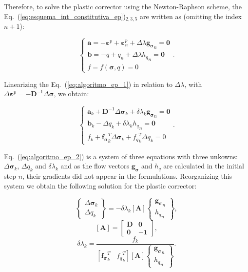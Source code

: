 \documentclass[Journal,letterpaper]{ascelike-new}
\newcommand{\All}{\boldsymbol A}
\newcommand{\al}{\boldsymbol a}
\newcommand{\bl}{\boldsymbol b}
\newcommand{\dfds}{\boldsymbol{f_\sigma}}
\newcommand{\dfdq}{{f_q}}
\newcommand{\dgds}{\boldsymbol{g_\sigma}}
\newcommand{\Dsdee}{\boldsymbol{D}}
\newcommand{\hl}{{h_q}}
\newcommand{\onell}{\boldsymbol{1}}
\newcommand{\strainp}{\boldsymbol{\varepsilon}^{p}}
\newcommand{\stress}{\boldsymbol{\sigma}}
\newcommand{\zerol}{\boldsymbol 0}
\begin{document}
Therefore, to solve the plastic corrector using the Newton-Raphson scheme, the Eq.~(\ref{eq:esquema_int_constitutiva_ep})$_{2,3,5}$ are written as (omitting the index $n+1$):

\begin{equation}
	\label{eq:algoritmo_ep_1}
	\left\{
	\begin{array}{lcl}
		\al = -\strainp + \strainp_n + \Delta \lambda \dgds_n = \zerol	\\
		\bl = -q + q_n + \Delta\lambda\hl_n = \zerol \\
		f = f(\stress,q) = 0
	\end{array}
	\right..
\end{equation}

Linearizing the Eq.~(\ref{eq:algoritmo_ep_1}) in relation to $\Delta \lambda$, with $\Delta \strainp = - \Dsdee^{-1}\Delta\stress$, we obtain:

\begin{equation}
	\label{eq:algoritmo_ep_2}
	\left\{
	\begin{array}{lcl}
		\al_k + \Dsdee^{-1}\Delta\stress_k + \delta \lambda_k \dgds_n = \zerol \\
		\bl_k - \Delta q_k + \delta \lambda_k \hl_n = \zerol \\
		f_k + \dfds_k^T\Delta\stress_k + \dfdq_k^T \Delta q_k = 0
	\end{array}
	\right..
\end{equation}

Eq.~(\ref{eq:algoritmo_ep_2}) is a system of three equations with three unkowns: $\Delta \stress_k$, $\Delta q_k$ and $\delta \lambda_k$ and as the flow vectors $\dgds$ and $\hl$ are calculated in the initial step $n$, their gradients did not appear in the formulations. Reorganizing this system we obtain the following solution for the plastic corrector:

\begin{equation}
	\label{eq:algoritmo_ep_3}
	\left\{
	\begin{array}{lcl}
		\Delta \stress_k \\
		\Delta q_k
	\end{array}
	\right\} = -\delta\lambda_k \left[ \All \right]
	\left\{	
	\begin{array}{lcl}
		\dgds_n \\
		\hl_n
	\end{array}
	\right\},
\end{equation}
\begin{equation}
	\label{eq:Ak}
	\left[ \All \right] =
	\begin{bmatrix}
		\Dsdee & \zerol \\
		\zerol & -\onell
	\end{bmatrix},
\end{equation}
\begin{equation}
	\label{eq:deltalambdak}
	\delta \lambda_k = \dfrac{f_k}{\left[\dfds_k^T~~~~\dfdq_k^T\right]\left[\All \right]\left\{ 
		\begin{array}{lcl}
			\dgds_n \\ 
			\hl_n
		\end{array}\right\}}.
\end{equation}
\end{document}
